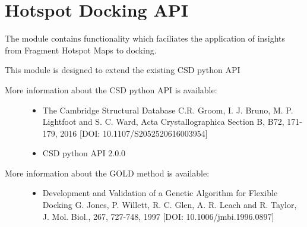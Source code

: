 \documentclass[letterpaper,10pt,english]{sphinxmanual}
\begin{document}
\chapter{Hotspot Docking API}
\label{\detokenize{hs_docking_api:module-hotspots.hs_docking}}\label{\detokenize{hs_docking_api:hotspot-docking-api}}\label{\detokenize{hs_docking_api::doc}}
The {\hyperref[\detokenize{hs_docking_api:module-hotspots.hs_docking}]{}} module contains functionality which
faciliates the  application of insights from Fragment
Hotspot Maps to docking.

This module is designed to extend the existing CSD python API
\begin{description}
\item[{More information about the CSD python API is available:}] \leavevmode\begin{itemize}
\item {} 
The Cambridge Structural Database C.R. Groom, I. J. Bruno, M. P. Lightfoot and S. C. Ward, Acta Crystallographica Section B, B72, 171-179, 2016 {[}DOI: 10.1107/S2052520616003954{]}

\item {} 
CSD python API 2.0.0 

\end{itemize}

\item[{More information about the GOLD method is available:}] \leavevmode\begin{itemize}
\item {} 
Development and Validation of a Genetic Algorithm for Flexible Docking G. Jones, P. Willett, R. C. Glen, A. R. Leach and R. Taylor, J. Mol. Biol., 267, 727-748, 1997 {[}DOI: 10.1006/jmbi.1996.0897{]}

\end{itemize}

\end{description}
\end{document}
